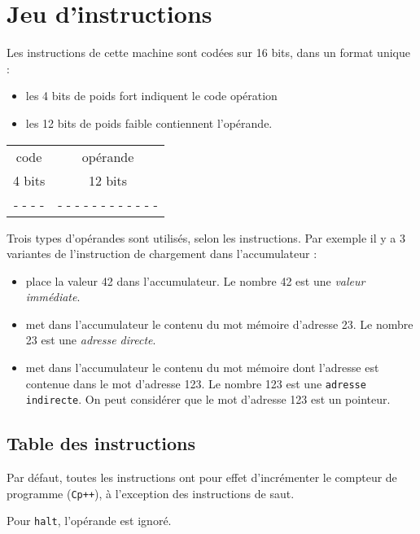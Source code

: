 \documentclass[10pt]{article}
\begin{document}
\section{Jeu d'instructions}

Les instructions de cette machine sont codées sur 16 bits, dans un format unique : 
\begin{itemize} 
\item les 4 bits
de poids fort indiquent le code opération
\item les 12 bits de poids faible contiennent l'opérande.
\end{itemize}

\begin{center}
\begin{tabular}{|c|c|}
\hline
code & opérande \\
4 bits & 12 bits \\
\hline
- - - - & - - - - - - - - - - - - \\
\hline
\end{tabular}
\end{center}
Trois types d'opérandes sont utilisés, selon les instructions. Par exemple il y a 3 variantes de l'instruction de chargement dans l'accumulateur :

\begin{itemize}
\item {} place la valeur 42 dans l'accumulateur. Le nombre 42 est une \emph{valeur immédiate}.

\item {} met dans l'accumulateur le contenu du
  mot mémoire d'adresse 23. Le nombre 23 est une \emph{ adresse
    directe}.
\item {} met dans l'accumulateur le contenu du
  mot mémoire dont l'adresse est contenue dans le mot d'adresse
  123. Le nombre 123 est une \texttt{adresse indirecte}. On peut
  considérer que le mot d'adresse 123 est un pointeur.
\end{itemize}

\subsection{Table des instructions}

Par défaut, toutes les instructions ont pour effet d'incrémenter le compteur de programme (\verb/Cp++/), à l'exception des
instructions de saut.

Pour \texttt{halt}, l'opérande est ignoré. 
\end{document}
